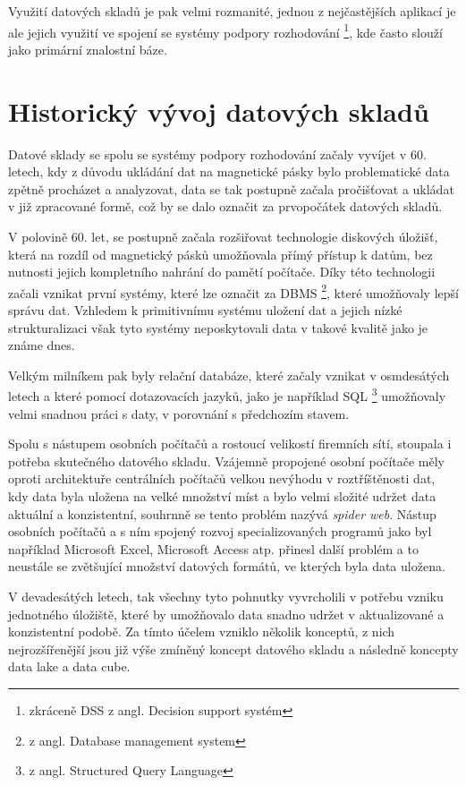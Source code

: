 \documentclass[
  digital,     %
  twoside,     %
  lof,         %
  lot,         %
]{fithesis4}
\begin{document}
Využití datových skladů je pak velmi rozmanité, jednou z nejčastějších aplikací je ale
jejich využití ve spojení se systémy podpory rozhodování \footnote{zkráceně DSS z angl. Decision support
systém}, kde často slouží jako primární znalostní báze. \parencite[s.~2]{Inmon2005}

\section{Historický vývoj datových skladů}
Datové sklady se spolu se systémy podpory rozhodování začaly vyvíjet v 60. letech,
kdy z důvodu ukládání dat na magnetické pásky bylo problematické data zpětně procházet a
analyzovat, data se tak postupně začala pročišťovat a ukládat v již zpracované formě, což by
se dalo označit za prvopočátek datových skladů.\parencite[s.~2]{Inmon2005}

V polovině 60. let, se postupně začala rozšiřovat technologie diskových úložišť, která
na rozdíl od magnetický pásků umožňovala přímý přístup k datům, bez nutnosti jejich
kompletního nahrání do pamětí počítače. Díky této technologii začali vznikat první systémy,
které lze označit za DBMS \footnote{z angl. Database management system}, které umožňovaly lepší
správu dat.\parencite{Foote19042018} Vzhledem k primitivnímu systému uložení dat a jejich nízké strukturalizaci 
však tyto systémy neposkytovali data v takové kvalitě jako je známe dnes.

Velkým milníkem pak byly relační databáze, které začaly vznikat v osmdesátých letech
a které pomocí dotazovacích jazyků, jako je například SQL \footnote{z angl. Structured Query
Language} umožňovaly velmi snadnou práci s daty, v porovnání s předchozím stavem.\parencite{Foote19042018}

Spolu s nástupem osobních počítačů a rostoucí velikostí firemních sítí, stoupala i
potřeba skutečného datového skladu. Vzájemně propojené osobní počítače měly oproti
architektuře centrálních počítačů velkou nevýhodu v roztříštěnosti dat, kdy data byla uložena
na velké množství míst a bylo velmi složité udržet data aktuální a konzistentní, souhrnně se
tento problém nazývá \emph{spider web}. \cite[s.~6]{Inmon2005} Nástup osobních počítačů a s 
ním spojený rozvoj specializovaných programů jako byl například Microsoft Excel, Microsoft Access atp. 
přinesl další problém a to neustále se zvětšující množství datových formátů, ve kterých byla data uložena.\parencite{Foote19042018}

V devadesátých letech, tak všechny tyto pohnutky vyvrcholili v potřebu vzniku
jednotného úložiště, které by umožňovalo data snadno udržet v aktualizované a konzistentní
podobě. Za tímto účelem vzniklo několik konceptů, z nich nejrozšířenější jsou již výše zmíněný koncept
datového skladu a následně koncepty data lake a data cube.
\end{document}
